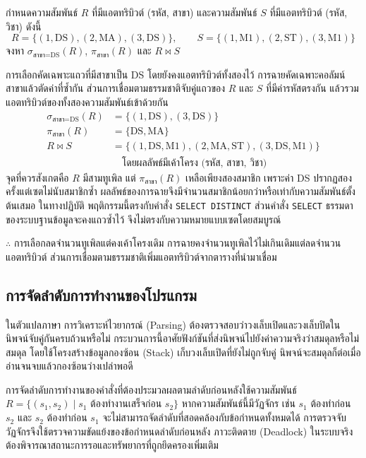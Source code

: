 \begin{ex}
\label{ex:relational-algebra}
กำหนดความสัมพันธ์ $R$ ที่มีแอตทริบิวต์ (รหัส, สาขา) และความสัมพันธ์ $S$ ที่มีแอตทริบิวต์ (รหัส, วิชา) ดังนี้
\[
R = \{(1,\text{DS}), (2,\text{MA}), (3,\text{DS})\}, \qquad
S = \{(1,\text{M1}), (2,\text{ST}), (3,\text{M1})\}
\]
จงหา $\sigma_{\text{สาขา}=\text{DS}}(R)$, $\pi_{\text{สาขา}}(R)$ และ $R \bowtie S$
\end{ex}
\begin{solution}
การเลือกคัดเฉพาะแถวที่มีสาขาเป็น DS โดยยังคงแอตทริบิวต์ทั้งสองไว้ การฉายคัดเฉพาะคอลัมน์สาขาแล้วตัดค่าที่ซ้ำกัน ส่วนการเชื่อมตามธรรมชาติจับคู่แถวของ $R$ และ $S$ ที่มีค่ารหัสตรงกัน แล้วรวมแอตทริบิวต์ของทั้งสองความสัมพันธ์เข้าด้วยกัน
\begin{align*}
\sigma_{\text{สาขา}=\text{DS}}(R) &= \{(1,\text{DS}), (3,\text{DS})\}\\
\pi_{\text{สาขา}}(R) &= \{\text{DS}, \text{MA}\}\\
R \bowtie S &= \{(1,\text{DS},\text{M1}), (2,\text{MA},\text{ST}), (3,\text{DS},\text{M1})\}\\
&\quad \text{โดยผลลัพธ์มีเค้าโครง (รหัส, สาขา, วิชา)}
\end{align*}
จุดที่ควรสังเกตคือ $R$ มีสามทูเพิล แต่ $\pi_{\text{สาขา}}(R)$ เหลือเพียงสองสมาชิก เพราะค่า DS ปรากฏสองครั้งแต่เซตไม่นับสมาชิกซ้ำ ผลลัพธ์ของการฉายจึงมีจำนวนสมาชิกน้อยกว่าหรือเท่ากับความสัมพันธ์ตั้งต้นเสมอ ในทางปฏิบัติ พฤติกรรมนี้ตรงกับคำสั่ง \texttt{SELECT DISTINCT} ส่วนคำสั่ง \texttt{SELECT} ธรรมดาของระบบฐานข้อมูลจะคงแถวซ้ำไว้ จึงไม่ตรงกับความหมายแบบเซตโดยสมบูรณ์

$\therefore$ การเลือกลดจำนวนทูเพิลแต่คงเค้าโครงเดิม การฉายคงจำนวนทูเพิลไว้ไม่เกินเดิมแต่ลดจำนวนแอตทริบิวต์ ส่วนการเชื่อมตามธรรมชาติเพิ่มแอตทริบิวต์จากตารางที่นำมาเชื่อม \solhere
\end{solution}

\subsection{การจัดลำดับการทำงานของโปรแกรม}
ในตัวแปลภาษา การวิเคราะห์ไวยากรณ์ (Parsing) ต้องตรวจสอบว่าวงเล็บเปิดและวงเล็บปิดในนิพจน์จับคู่กันครบถ้วนหรือไม่ กระบวนการนี้อาศัยฟังก์ชันที่ส่งนิพจน์ไปยังค่าความจริงว่าสมดุลหรือไม่สมดุล โดยใช้โครงสร้างข้อมูลกองซ้อน (Stack) เก็บวงเล็บเปิดที่ยังไม่ถูกจับคู่ นิพจน์จะสมดุลก็ต่อเมื่ออ่านจนจบแล้วกองซ้อนว่างเปล่าพอดี~\parencite{johnsonbaugh2016discrete}

การจัดลำดับการทำงานของคำสั่งที่ต้องประมวลผลตามลำดับก่อนหลังใช้ความสัมพันธ์ $R = \{(s_1, s_2) \mid s_1 \text{ ต้องทำงานเสร็จก่อน } s_2\}$ หากความสัมพันธ์นี้มีวัฏจักร เช่น $s_1$ ต้องทำก่อน $s_2$ และ $s_2$ ต้องทำก่อน $s_1$ จะไม่สามารถจัดลำดับที่สอดคล้องกับข้อกำหนดทั้งหมดได้ การตรวจจับวัฏจักรจึงใช้ตรวจความขัดแย้งของข้อกำหนดลำดับก่อนหลัง ภาวะติดตาย (Deadlock) ในระบบจริงต้องพิจารณาสถานะการรอและทรัพยากรที่ถูกยึดครองเพิ่มเติม

